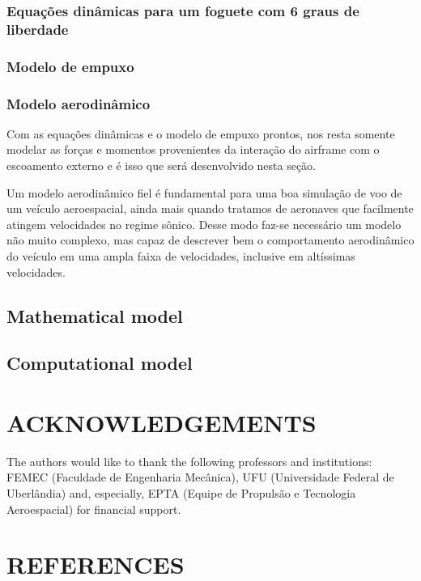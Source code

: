 \documentclass[10pt,fleqn,a4paper,twoside]{article}
\begin{document}
\subsubsection{Equações dinâmicas para um foguete com 6 graus de liberdade}

\subsubsection{Modelo de empuxo}

\subsubsection{Modelo aerodinâmico}
Com as equações dinâmicas e o modelo de empuxo prontos, nos resta somente modelar as forças e momentos provenientes da interação do airframe com o escoamento externo e é isso que será desenvolvido nesta seção.

Um modelo aerodinâmico fiel é fundamental para uma boa simulação de voo de um veículo aeroespacial, ainda mais quando tratamos de aeronaves que facilmente atingem velocidades no regime sônico. Desse modo faz-se necessário um modelo não muito complexo, mas capaz de descrever bem o comportamento aerodinâmico do veículo em uma ampla faixa de velocidades, inclusive em altíssimas velocidades.


\subsection{Mathematical model}

\subsection{Computational model}


\section{ACKNOWLEDGEMENTS}

The authors would like to thank the following professors and institutions: FEMEC (Faculdade de Engenharia Mecânica), UFU (Universidade Federal de Uberlândia) and, especially, EPTA (Equipe de Propulsão e Tecnologia Aeroespacial) for financial support.




\section{REFERENCES} 


\renewcommand{\refname}{}

\end{document}
